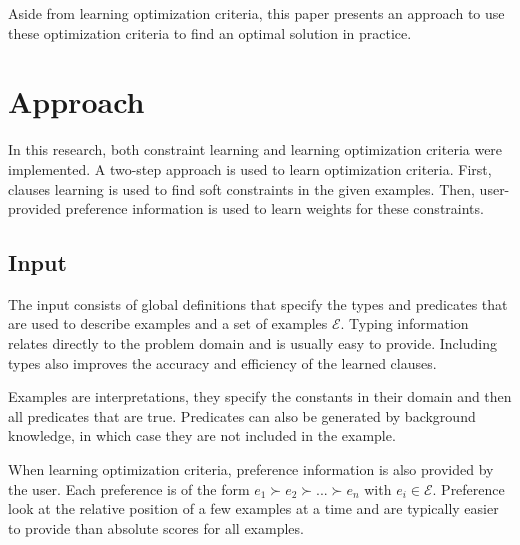 \documentclass[letterpaper]{article}
\newcommand{\sym}[1]{\ensuremath{\mathcal{#1}}}
\theoremstyle{definition}
\begin{document}
Aside from learning optimization criteria, this paper presents an approach to use these optimization criteria to find an optimal solution in practice.


\section{Approach}
In this research, both constraint learning and learning optimization criteria were implemented.
A two-step approach is used to learn optimization criteria.
First, clauses learning is used to find soft constraints in the given examples.
Then, user-provided preference information is used to learn weights for these constraints.


\subsection{Input}
The input consists of global definitions that specify the types and predicates that are used to describe examples and a set of examples \sym{E}.
Typing information relates directly to the problem domain and is usually easy to provide.
Including types also improves the accuracy and efficiency of the learned clauses.

Examples are interpretations, they specify the constants in their domain and then all predicates that are true.
Predicates can also be generated by background knowledge, in which case they are not included in the example.

When learning optimization criteria, preference information is also provided by the user.
Each preference is of the form $e_1 \succ e_2 \succ ... \succ e_n$ with $e_i \in \sym{E}$.
Preference look at the relative position of a few examples at a time and are typically easier to provide than absolute scores for all examples.
\end{document}
